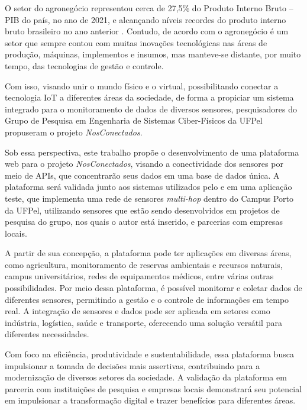 \documentclass[tcc,capa]{texufpel}
\begin{document}
O setor do agronegócio representou cerca de 27,5\% do Produto Interno Bruto – PIB do país, no ano de 2021, e alcançando níveis recordes do produto interno bruto brasileiro no ano anterior \cite{Cepea:2021}. Contudo, de acordo com \citet{suinocultura:2022} o agronegócio é um setor que sempre contou com muitas inovações tecnológicas nas áreas de produção, máquinas, implementos e insumos, mas manteve-se distante, por muito tempo, das tecnologias de gestão e controle. 

Com isso, visando unir o mundo físico e o virtual, possibilitando conectar a tecnologia IoT a diferentes áreas da sociedade, de forma a propiciar um sistema integrado para o monitoramento de dados de diversos sensores, pesquisadores do Grupo de Pesquisa em Engenharia de Sistemas Ciber-Físicos da UFPel propuseram o projeto \textit{NosConectados}. 

Sob essa perspectiva, este trabalho propõe o desenvolvimento de uma plataforma web para o projeto \textit{NosConectados}, visando a conectividade dos sensores por meio de APIs, que concentrarão seus dados em uma base de dados única. A plataforma será validada junto aos sistemas utilizados pelo \citet{hidrosedi:2022} e em uma aplicação teste, que implementa uma rede de sensores \textit{multi-hop} dentro do Campus Porto da UFPel, utilizando sensores que estão sendo desenvolvidos em projetos de pesquisa do grupo, nos quais o autor está inserido, e parcerias com empresas locais.

A partir de sua concepção,  a plataforma pode ter aplicações em diversas áreas, como agricultura, monitoramento de reservas ambientais e recursos naturais, campus universitários, redes de equipamentos médicos, entre várias outras possibilidades. Por meio dessa plataforma, é possível monitorar e coletar dados de diferentes sensores, permitindo a gestão e o controle de informações em tempo real. A integração de sensores e dados pode ser aplicada em setores como indústria, logística, saúde e transporte, oferecendo uma solução versátil para diferentes necessidades.

Com foco na eficiência, produtividade e sustentabilidade, essa plataforma busca impulsionar a tomada de decisões mais assertivas, contribuindo para a modernização de diversos setores da sociedade. A validação da plataforma em parceria com instituições de pesquisa e empresas locais demonstrará seu potencial em impulsionar a transformação digital e trazer benefícios para diferentes áreas.
\end{document}
